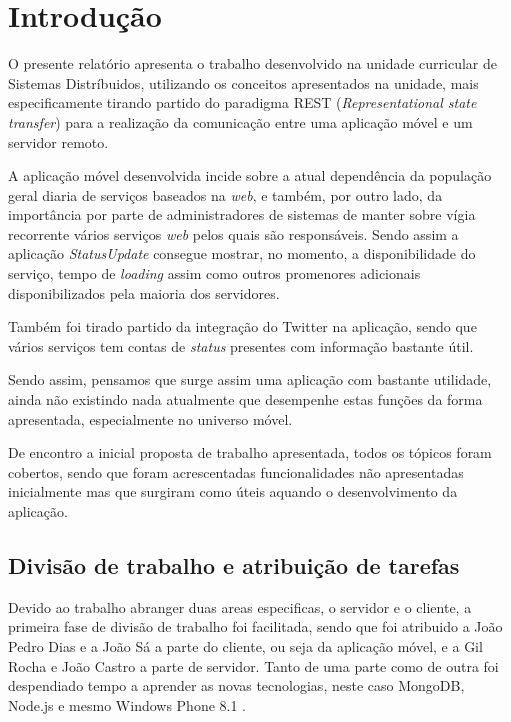 \documentclass[12pt]{article}
\begin{document}
\newpage

\section{Introdução}

O presente relatório apresenta o trabalho desenvolvido na unidade curricular de Sistemas Distríbuidos, utilizando os conceitos apresentados na unidade, mais especificamente tirando partido do paradigma REST (\textit{Representational state transfer}) para a realização da comunicação entre uma aplicação móvel e um servidor remoto.

	A aplicação móvel desenvolvida incide sobre a atual dependência da população geral diaria de serviços baseados na \textit{web}, e também, por outro lado, da importância por parte de administradores de sistemas  de manter sobre vígia recorrente vários serviços \textit{web} pelos quais são responsáveis. Sendo assim a aplicação \textit{StatusUpdate} consegue mostrar, no momento, a disponibilidade do serviço, tempo de \textit{loading} assim como outros promenores adicionais disponibilizados pela maioria dos servidores.
	
	Também foi tirado partido da integração do Twitter na aplicação, sendo que vários serviços tem contas de \textit{status} presentes com informação bastante útil.
	
	Sendo assim, pensamos que surge assim uma aplicação com bastante  utilidade, ainda não existindo nada atualmente que desempenhe estas funções da forma apresentada, especialmente no universo móvel.
	
	De encontro a inicial proposta de trabalho apresentada, todos os tópicos foram cobertos, sendo que foram acrescentadas funcionalidades não apresentadas inicialmente mas que surgiram como úteis aquando o desenvolvimento da aplicação. 

\subsection{Divisão de trabalho e atribuição de tarefas}

Devido ao trabalho abranger duas areas especificas, o servidor e o cliente, a primeira fase de divisão de trabalho foi facilitada, sendo que foi atribuido a João Pedro Dias e a João Sá a parte do cliente, ou seja da aplicação móvel, e a Gil Rocha e João Castro a parte de servidor.  Tanto de uma parte como de outra foi despendiado tempo a aprender as novas tecnologias, neste caso MongoDB, Node.js e mesmo Windows Phone 8.1 . 
\end{document}
